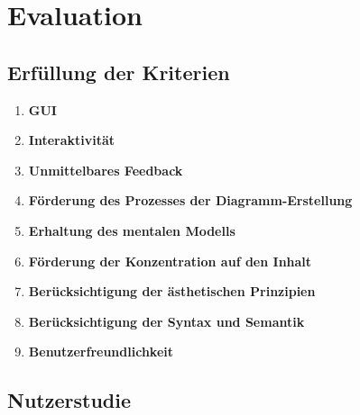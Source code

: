 
\chapter{Evaluation}
\label{chapter:evaluation}

\section{Erfüllung der Kriterien}


\begin{enumerate}[label={K.\arabic*}]

\item
\label{eval:gui}
\textbf{GUI}

\item
\label{eval:interactivity}
\textbf{Interaktivität}

\item
\label{eval:immediate-feedback}
\textbf{Unmittelbares Feedback}

\item
\label{eval:editing-support}
\textbf{Förderung des Prozesses der Diagramm-Erstellung}

\item
\label{eval:mental-map}
\textbf{Erhaltung des mentalen Modells}

\item
\label{eval:focus-on-the-content}
\textbf{Förderung der Konzentration auf den Inhalt}

\item
\label{eval:aesthetics-criteria}
\textbf{Berücksichtigung der ästhetischen Prinzipien}


\item
\label{eval:syntax-and-semantics}
\textbf{Berücksichtigung der Syntax und Semantik}

\item
\label{eval:user-friendly}
\textbf{Benutzerfreundlichkeit}

\end{enumerate}


\section{Nutzerstudie}

